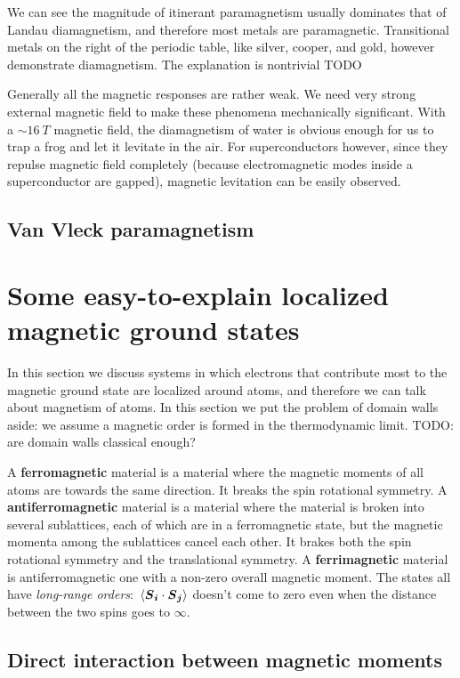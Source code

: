 \documentclass[hyperref, a4paper]{article}
\newcommand*{\concept}[1]{{\textbf{#1}}}
\begin{document}
We can see the magnitude of itinerant paramagnetism usually dominates that of Landau diamagnetism,
and therefore most metals are paramagnetic. 
Transitional metals on the right of the periodic table, like silver, cooper, and gold,
however demonstrate diamagnetism.
The explanation is nontrivial TODO

Generally all the magnetic responses are rather weak. 
We need very strong external magnetic field 
to make these phenomena mechanically significant.
With a $\sim \SI{16}{T}$ magnetic field,
the diamagnetism of water is obvious enough 
for us to trap a frog and let it levitate in the air.
For superconductors however, 
since they repulse magnetic field completely
(because electromagnetic modes inside a superconductor are gapped),
magnetic levitation can be easily observed.

\subsection{Van Vleck paramagnetism}

\section{Some easy-to-explain localized magnetic ground states}

In this section we discuss systems in which 
electrons that contribute most to the magnetic ground state 
are localized around atoms,
and therefore we can talk about magnetism of atoms.
In this section we put the problem of domain walls aside: 
we assume a magnetic order is formed in the thermodynamic limit. TODO: are domain walls classical enough?

A \concept{ferromagnetic} material is a material 
where the magnetic moments of all atoms are towards the same direction.
It breaks the spin rotational symmetry.
A \concept{antiferromagnetic} material is a material
where the material is broken into several sublattices,
each of which are in a ferromagnetic state,
but the magnetic momenta among the sublattices cancel each other.
It brakes both the spin rotational symmetry 
and the translational symmetry.
A \concept{ferrimagnetic} material is antiferromagnetic one with a non-zero overall magnetic moment.
The states all have \emph{long-range orders}:
$\expval*{\vb*{S}_{\vb*{i}} \cdot \vb*{S}_{\vb*{j}}}$ doesn't come to zero 
even when the distance between the two spins goes to $\infty$.

\subsection{Direct interaction between magnetic moments}
\end{document}
